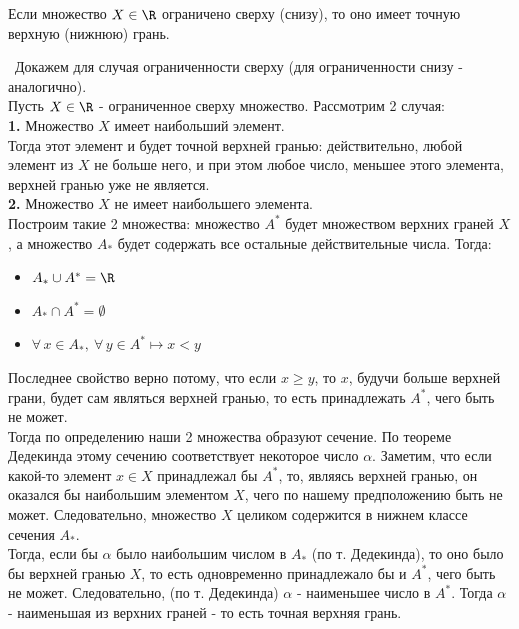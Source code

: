 \begin{theorem}
    Если множество \(X\in\R\) ограничено сверху (снизу), 
    то оно имеет точную верхную (нижнюю) грань.

    \vspace{2mm}

    \proofname~Докажем для случая ограниченности сверху (для ограниченности снизу - аналогично). \\
    Пусть \(X\in\R\) - ограниченное сверху множество. Рассмотрим 2 случая: \\
        \indent \textbf{1.} Множество \(X\) имеет наибольший элемент. \\
        Тогда этот элемент и будет точной верхней гранью: действительно,
        любой элемент из \(X\) не больше него, и при этом любое число,
        меньшее этого элемента, верхней гранью уже не является.\\
        \indent \textbf{2.} Множество \(X\) не имеет наибольшего элемента.\\
        Построим такие 2 множества: множество \(A^{*}\) будет множеством верхних граней \(X\),
        а множество \(A_{*}\) будет содержать все остальные действительные числа. Тогда:
        \begin{itemize}
            \item \(A_{*} \cup A^{*} = \R\)
            \item \(A_{*} \cap A^{*} = \emptyset\)
            \item \(\forall\,x\in A_{*},~\forall\,y\in A^{*} \longmapsto x < y\)
        \end{itemize}
        Последнее свойство верно потому, что если \(x\geq y\), то \(x\), 
        будучи больше верхней грани, будет сам являться верхней гранью,
        то есть принадлежать \(A^{*}\), чего быть не может.\\
        Тогда по определению наши 2 множества образуют сечение.
        По теореме Дедекинда этому сечению соответствует некоторое число \(\alpha\).
        Заметим, что если какой-то элемент \(x\in X\) принадлежал бы \(A^{*}\),
        то, являясь верхней гранью, он оказался бы наибольшим элементом \(X\),
        чего по нашему предположению быть не может.
        Следовательно, множество \(X\) целиком содержится в нижнем классе сечения \(A_{*}\).\\
        Тогда, если бы \(\alpha\) было наибольшим числом в \(A_{*}\) (по т. Дедекинда),
        то оно было бы верхней гранью \(X\), то есть одновременно принадлежало бы и \(A^{*}\),
        чего быть не может.
        Следовательно, (по т. Дедекинда) \(\alpha\) - наименьшее число в \(A^{*}\).
        Тогда \(\alpha\) - наименьшая из верхних граней - то есть точная верхняя грань.~\qedsymbol
\end{theorem}

